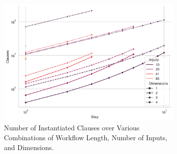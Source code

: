 \begin{figure}[h]
    \centering
    \begin{subfigure}[t]{.67\textwidth}
        \centering
        \includegraphics[width=\textwidth]{Tex//images/complexity_left.png}
        \caption{Number of Instantiated Clauses over Various Combinations of Workflow Length, Number of Inputs, and Dimensions.}
        \label{fig:native_ape_complex_left}
    \end{subfigure}%
    \hfill
    \begin{subfigure}[t]{.28\textwidth}
        \centering

\end{subfigure}
\end{figure}

